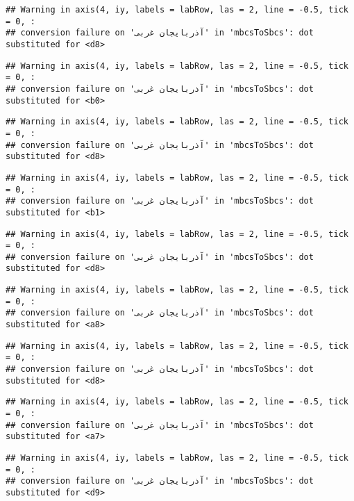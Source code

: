 \documentclass[
]{article}
\begin{document}
\begin{verbatim}
## Warning in axis(4, iy, labels = labRow, las = 2, line = -0.5, tick = 0, :
## conversion failure on 'آذربايجان غربی' in 'mbcsToSbcs': dot substituted for <d8>
\end{verbatim}

\begin{verbatim}
## Warning in axis(4, iy, labels = labRow, las = 2, line = -0.5, tick = 0, :
## conversion failure on 'آذربايجان غربی' in 'mbcsToSbcs': dot substituted for <b0>
\end{verbatim}

\begin{verbatim}
## Warning in axis(4, iy, labels = labRow, las = 2, line = -0.5, tick = 0, :
## conversion failure on 'آذربايجان غربی' in 'mbcsToSbcs': dot substituted for <d8>
\end{verbatim}

\begin{verbatim}
## Warning in axis(4, iy, labels = labRow, las = 2, line = -0.5, tick = 0, :
## conversion failure on 'آذربايجان غربی' in 'mbcsToSbcs': dot substituted for <b1>
\end{verbatim}

\begin{verbatim}
## Warning in axis(4, iy, labels = labRow, las = 2, line = -0.5, tick = 0, :
## conversion failure on 'آذربايجان غربی' in 'mbcsToSbcs': dot substituted for <d8>
\end{verbatim}

\begin{verbatim}
## Warning in axis(4, iy, labels = labRow, las = 2, line = -0.5, tick = 0, :
## conversion failure on 'آذربايجان غربی' in 'mbcsToSbcs': dot substituted for <a8>
\end{verbatim}

\begin{verbatim}
## Warning in axis(4, iy, labels = labRow, las = 2, line = -0.5, tick = 0, :
## conversion failure on 'آذربايجان غربی' in 'mbcsToSbcs': dot substituted for <d8>
\end{verbatim}

\begin{verbatim}
## Warning in axis(4, iy, labels = labRow, las = 2, line = -0.5, tick = 0, :
## conversion failure on 'آذربايجان غربی' in 'mbcsToSbcs': dot substituted for <a7>
\end{verbatim}

\begin{verbatim}
## Warning in axis(4, iy, labels = labRow, las = 2, line = -0.5, tick = 0, :
## conversion failure on 'آذربايجان غربی' in 'mbcsToSbcs': dot substituted for <d9>
\end{verbatim}
\end{document}
